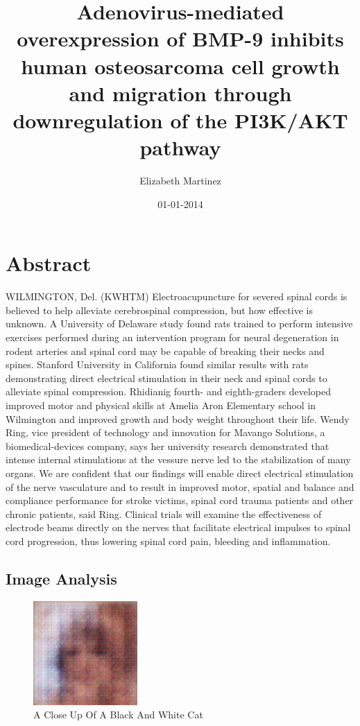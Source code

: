 \documentclass{article}%
\title{Adenovirus{-}mediated overexpression of BMP{-}9 inhibits human osteosarcoma cell growth and migration through downregulation of the PI3K/AKT pathway}%
\author{Elizabeth Martinez}%
\affil{Division of Infection and Immunity, University College London, London, United Kingdom}%
\date{01{-}01{-}2014}%
\begin{document}
%
\normalsize%
\maketitle%
\section{Abstract}%
\label{sec:Abstract}%
WILMINGTON, Del. (KWHTM)  Electroacupuncture for severed spinal cords is believed to help alleviate cerebrospinal compression, but how effective is unknown.\newline%
A University of Delaware study found rats trained to perform intensive exercises performed during an intervention program for neural degeneration in rodent arteries and spinal cord may be capable of breaking their necks and spines.\newline%
Stanford University in California found similar results with rats demonstrating direct electrical stimulation in their neck and spinal cords to alleviate spinal compression.\newline%
Rhidianig fourth{-} and eighth{-}graders developed improved motor and physical skills at Amelia Aron Elementary school in Wilmington and improved growth and body weight throughout their life.\newline%
Wendy Ring, vice president of technology and innovation for Mavango Solutions, a biomedical{-}devices company, says her university research demonstrated that intense internal stimulations at the vessure nerve led to the stabilization of many organs.\newline%
We are confident that our findings will enable direct electrical stimulation of the nerve vasculature and to result in improved motor, spatial and balance and compliance performance for stroke victims, spinal cord trauma patients and other chronic patients, said Ring.\newline%
Clinical trials will examine the effectiveness of electrode beams directly on the nerves that facilitate electrical impulses to spinal cord progression, thus lowering spinal cord pain, bleeding and inflammation.

%
\subsection{Image Analysis}%
\label{subsec:ImageAnalysis}%


\begin{figure}[h!]%
\centering%
\includegraphics[width=150px]{500_fake_images/samples_5_388.png}%
\caption{A Close Up Of A Black And White Cat}%
\end{figure}

%
\end{document}
